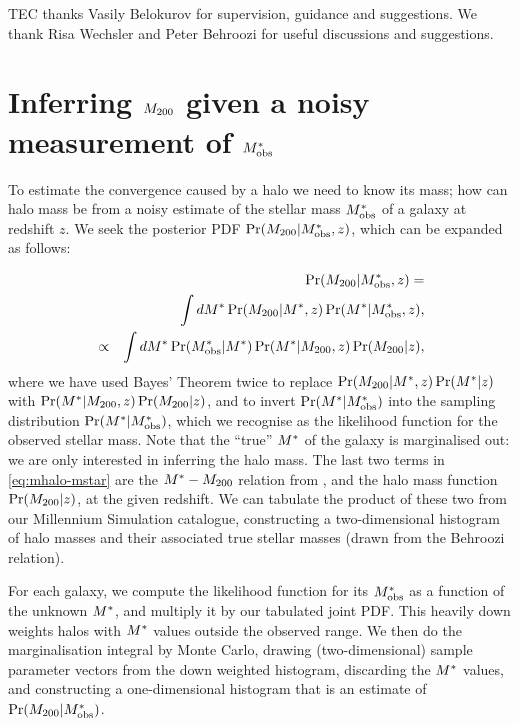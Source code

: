 \documentclass[useAMS,usenatbib]{mn2e}
\begin{document}
TEC thanks Vasily Belokurov for supervision, guidance and suggestions.
We thank Risa Wechsler and Peter Behroozi 
for useful discussions and suggestions.



\appendix


\section{Inferring $M_{200}$ given a noisy measurement of $M^{*}_{\rm obs}$}
\label{appendix:MSMH}

To estimate the convergence caused by a halo we need to know its mass; how can 
halo mass be \infered from a noisy estimate of the stellar mass $M^{*}_{\rm obs}$
of a galaxy at redshift $z$. We seek the posterior
PDF $\Pr(M_{200}|M^{*}_{\rm obs},z)$, which can be expanded as follows:

\begin{eqnarray}
&& \Pr(M_{200}|M^{*}_{\rm obs},z) = \notag\\
&& \int dM^{*} \Pr(M_{200}|M^{*},z) \Pr(M^{*}|M^{*}_{\rm obs},z), \notag\\
&\propto& \int dM^{*} \Pr(M^{*}_{\rm obs}|M^{*}) \Pr(M^{*}|M_{200},z) \Pr(M_{200}|z),
\label{eq:mhalo-mstar}
\end{eqnarray}
where we have used Bayes' Theorem twice to replace
$\Pr(M_{200}|M^{*},z) \Pr(M^{*}|z)$ with 
$\Pr(M^{*}|M_{200},z) \Pr(M_{200}|z)$, and 
to invert $\Pr(M^{*}|M^{*}_{\rm obs})$ into the sampling
distribution $\Pr(M^{*}|M^{*}_{\rm obs})$, which we recognise as the likelihood
function for the observed stellar mass. Note that the ``true'' $M^{*}$ of the
galaxy is marginalised out: we are only interested in inferring the halo
mass. The last two terms in
\eqref{eq:mhalo-mstar} are the $M^{*}-M_{200}$ relation from
\citet{BehrooziEtal2010}, and the halo mass function $\Pr(M_{200}|z)$, at the
given redshift. We can
tabulate the product of these two from our Millennium Simulation catalogue,
constructing a two-dimensional histogram of halo masses and their associated
true stellar masses (drawn from the Behroozi relation). 

For each galaxy, we compute the likelihood function for its $M^{*}_{\rm obs}$ as a
function of the unknown $M^{*}$, and multiply it by our tabulated joint PDF.
This heavily down weights halos with $M^{*}$ values outside the observed
range. We then do the marginalisation integral by Monte Carlo, drawing
(two-dimensional) sample parameter vectors
from the down weighted histogram, discarding the $M^{*}$ values, and
constructing a one-dimensional histogram that is an estimate of
$\Pr(M_{200}|M^{*}_{\rm obs})$.
\end{document}

